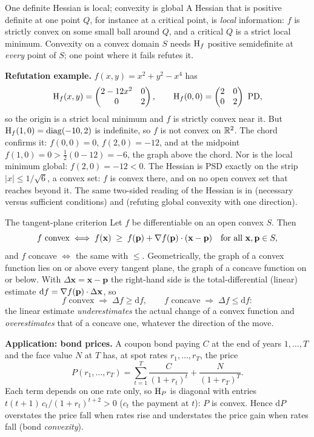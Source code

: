 \begin{rulebox}{One definite Hessian is local; convexity is global}
A Hessian that is positive definite at one point $Q$, for instance at a
critical point, is \emph{local} information: $f$ is strictly convex on some
small ball around $Q$, and a critical $Q$ is a strict local minimum.
Convexity on a convex domain $S$ needs $\operatorname{H}_f$ positive semidefinite at
\emph{every} point of $S$; one point where it fails refutes it.

\textbf{Refutation example.} $f(x,y)=x^{2}+y^{2}-x^{4}$ has
\[
  \Hess_f(x,y)=\begin{pmatrix}2-12x^{2}&0\\0&2\end{pmatrix},
  \qquad \Hess_f(0,0)=\begin{pmatrix}2&0\\0&2\end{pmatrix}\ \text{PD},
\]
so the origin is a strict local minimum and $f$ is strictly convex near
it. But $\operatorname{H}_f(1,0)=\operatorname{diag}(-10,2)$ is indefinite, so $f$ is
not convex on $\mathbb{R}^{2}$. The chord confirms it: $f(0,0)=0$, $f(2,0)=-12$,
and at the midpoint $f(1,0)=0>\tfrac12(0-12)=-6$, the graph above the
chord. Nor is the local minimum global: $f(2,0)=-12<0$. The Hessian is PSD
exactly on the strip $|x|\le1/\sqrt6$, a convex set: $f$ is convex
there, and on no open convex set that reaches beyond it. The same two-sided reading of the Hessian is in
 (necessary versus sufficient conditions) and
 (refuting global convexity with one direction).
\end{rulebox}

\begin{rulebox}{The tangent-plane criterion}
Let $f$ be differentiable on an open convex $S$. Then
\[
  f \text{ convex} \iff
  f(\mathbf{x})\;\ge\; f(\mathbf{p})+\nabla f(\mathbf{p})\cdot(\mathbf{x}-\mathbf{p})
  \quad\text{for all } \mathbf{x},\mathbf{p}\in S,
\]
and $f$ concave $\iff$ the same with $\le$. Geometrically, the graph of a
convex function lies on or above every tangent plane, the graph of a
concave function on or below. With $\Delta\mathbf{x}=\mathbf{x}-\mathbf{p}$
the right-hand side is the total-differential (linear) estimate
$\mathrm{d}f=\nabla f(\mathbf{p})\cdot\Delta\mathbf{x}$, so
\[
  f \text{ convex}\;\Rightarrow\;\Delta f\ge\mathrm{d}f,
  \qquad
  f \text{ concave}\;\Rightarrow\;\Delta f\le\mathrm{d}f :
\]
the linear estimate \emph{underestimates} the actual change of a convex
function and \emph{overestimates} that of a concave one, whatever the
direction of the move.

\textbf{Application: bond prices.} A coupon bond paying $C$ at the end of
years $1,\dots,T$ and the face value $N$ at $T$ has, at spot rates
$r_1,\dots,r_T$, the price
\[
  P(r_1,\dots,r_T)=\sum_{t=1}^{T}\frac{C}{(1+r_t)^{t}}
  +\frac{N}{(1+r_T)^{T}} .
\]
Each term depends on one rate only, so $\operatorname{H}_P$ is diagonal with entries
$t(t+1)\,c_t/(1+r_t)^{t+2}>0$ ($c_t$ the payment at $t$): $P$ is convex.
Hence $\mathrm{d}P$ overstates the price fall when rates rise and
understates the price gain when rates fall (bond \emph{convexity}).
\end{rulebox}

